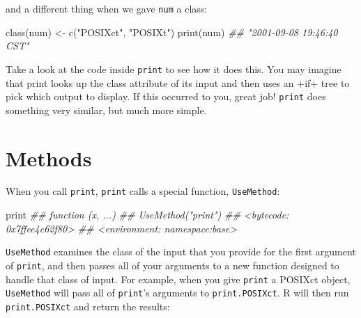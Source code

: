 \documentclass[
  letterpaper,
  DIV=11,
  numbers=noendperiod]{scrbook}
\newenvironment{Shaded}{\begin{snugshade}}{\end{snugshade}}
\newcommand{\DocumentationTok}[1]{\textcolor[rgb]{0.37,0.37,0.37}{\textit{#1}}}
\newcommand{\FunctionTok}[1]{\textcolor[rgb]{0.28,0.35,0.67}{#1}}
\newcommand{\NormalTok}[1]{\textcolor[rgb]{0.00,0.23,0.31}{#1}}
\newcommand{\OtherTok}[1]{\textcolor[rgb]{0.00,0.23,0.31}{#1}}
\newcommand{\StringTok}[1]{\textcolor[rgb]{0.13,0.47,0.30}{#1}}
\begin{document}
and a different thing when we gave \texttt{num} a class:

\begin{Shaded}
\begin{Highlighting}[]
\FunctionTok{class}\NormalTok{(num) }\OtherTok{\textless{}{-}} \FunctionTok{c}\NormalTok{(}\StringTok{"POSIXct"}\NormalTok{, }\StringTok{"POSIXt"}\NormalTok{)}
\FunctionTok{print}\NormalTok{(num)}
\DocumentationTok{\#\# "2001{-}09{-}08 19:46:40 CST"}
\end{Highlighting}
\end{Shaded}

Take a look at the code inside \texttt{print} to see how it does this.
You may imagine that print looks up the class attribute of its input and
then uses an +if+ tree to pick which output to display. If this occurred
to you, great job! \texttt{print} does something very similar, but much
more simple.

\section{Methods}\label{methods}

When you call \texttt{print}, \texttt{print} calls a special function,
\texttt{UseMethod}:

\begin{Shaded}
\begin{Highlighting}[]
\NormalTok{print}
\DocumentationTok{\#\# function (x, ...) }
\DocumentationTok{\#\# UseMethod("print")}
\DocumentationTok{\#\# \textless{}bytecode: 0x7ffee4c62f80\textgreater{}}
\DocumentationTok{\#\# \textless{}environment: namespace:base\textgreater{}}
\end{Highlighting}
\end{Shaded}

\texttt{UseMethod} examines the class of the input that you provide for
the first argument of \texttt{print}, and then passes all of your
arguments to a new function designed to handle that class of input. For
example, when you give \texttt{print} a POSIXct object,
\texttt{UseMethod} will pass all of \texttt{print}'s arguments to
\texttt{print.POSIXct}. R will then run \texttt{print.POSIXct} and
return the results:
\end{document}

